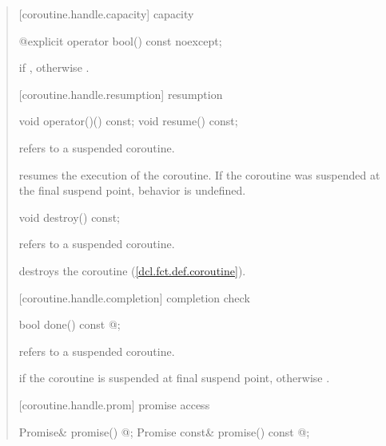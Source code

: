 \begin{quote}
[coroutine.handle.capacity]{ capacity}
\begin{itemdecl}
  @\cbstart{}\cbend@ explicit operator bool() const noexcept;
\end{itemdecl}

\begin{itemdescr}
  \pnum
  \returns {} if , otherwise .
\end{itemdescr}

[coroutine.handle.resumption]{ resumption}
\begin{itemdecl}
  void operator()() const;
  void resume() const;	
\end{itemdecl}
\begin{itemdescr}
  \pnum
  \precondition {} refers to a suspended coroutine.
  
  \pnum
  \effects resumes the execution of the coroutine. If the coroutine was suspended
  at the final suspend point, behavior is undefined.
\end{itemdescr}

\begin{itemdecl}
  void destroy() const;
\end{itemdecl}
\begin{itemdescr}
  \pnum
  \precondition {} refers to a suspended coroutine.
  
  \pnum
  \effects destroys the coroutine (\ref{dcl.fct.def.coroutine}).
\end{itemdescr}

[coroutine.handle.completion]{ completion check}
\begin{itemdecl}
  bool done() const  @\cbstart{}\cbend@; 
\end{itemdecl}
\begin{itemdescr}
  \pnum
  \precondition {} refers to a suspended coroutine.
  
  \pnum
  \returns {} if the coroutine is suspended
  at final suspend point, otherwise .
\end{itemdescr}

[coroutine.handle.prom]{ promise access}
\begin{itemdecl}
  Promise& promise()  @\cbstart{}\cbend@;		
  Promise const& promise() const  @\cbstart{}\cbend@;
\end{itemdecl}


\end{quote}
